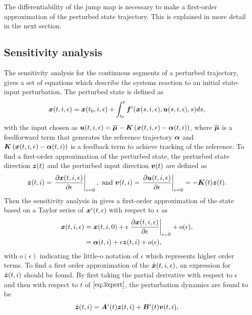 \documentclass[../DC2017114Bouma.tex]{subfiles}
\begin{document}
The differentiability of the jump map is necessary to make a first-order approximation of the perturbed state trajectory. This is explained in more detail in the next section.

\subsection{Sensitivity analysis}
The sensitivity analysis for the continuous segments of a perturbed trajectory, gives a set of equations which describe the systems reaction to an initial state-input perturbation. The perturbed state is defined as
\begin{align}
{\boldsymbol{x}}(t,i,\epsilon) = {\boldsymbol{x}}(t_0,i,\epsilon) + \int_{t_0}^{t}{\boldsymbol{f}}^i({\boldsymbol{x}}(s,i,\epsilon),{\boldsymbol{u}}(s,i,\epsilon),s)ds,\label{eq:3xpert}
\end{align}
with the input chosen as ${\boldsymbol{u}}(t,i,\epsilon) = \overline{\boldsymbol{\mu}} - {\boldsymbol{K}}\left({\boldsymbol{x}}(t,i,\epsilon)-\boldsymbol{\alpha}(t,i)\right)$, where $\overline{\boldsymbol{\mu}}$ is a feedforward term that generates the reference trajectory $\boldsymbol{\alpha}$ and ${\boldsymbol{K}}\left({\boldsymbol{x}}(t,i,\epsilon)-\boldsymbol{\alpha}(t,i)\right)$ is a feedback term to achieve tracking of the reference. To find a first-order approximation of the perturbed state, the perturbed state direction ${\boldsymbol{z}}(t)$ and the perturbed input direction ${\boldsymbol{v}}(t)$ are defined as
\begin{align}
{\boldsymbol{z}}(t,i) = \left.\frac{\partial{\boldsymbol{x}}(t,i,\epsilon)}{\partial\epsilon}\right|_{\epsilon=0},\text{ and } {\boldsymbol{v}}(t,i) = \left.\frac{\partial{\boldsymbol{u}}(t,i,\epsilon)}{\partial\epsilon}\right|_{\epsilon=0}=-{\boldsymbol{K}}(t){\boldsymbol{z}}(t).
\end{align}
Then the sensitivity analysis in \cite{Khalil1996} gives a first-order approximation of the state based on a Taylor series of ${\boldsymbol{x}}^i(t,\epsilon)$ with respect to $\epsilon$ as
\begin{align}
{\boldsymbol{x}}(t,i,\epsilon) &= {\boldsymbol{x}}(t,i,0) + \epsilon\left.\frac{\partial{\boldsymbol{x}}(t,i,\epsilon)}{\partial\epsilon}\right|_{\epsilon=0} + o(\epsilon),\label{eq:3taylor}\\
&= \boldsymbol{\alpha}(t,i) + \epsilon{\boldsymbol{z}}(t,i) + o(\epsilon),
\end{align}
with $o(\epsilon)$ indicating the little-o notation of $\epsilon$ which represents higher order terms. To find a first order approximation of the $\dot{{\boldsymbol{x}}}(t,i,\epsilon)$, an expression for $\dot{{\boldsymbol{z}}}(t,i)$ should be found. By first taking the partial derivative with respect to $\epsilon$ and then with respect to $t$ of $\eqref{eq:3xpert}$, the perturbation dynamics are found to be
\begin{align}
\dot{{\boldsymbol{z}}}(t,i) = {\boldsymbol{A}}^i(t){\boldsymbol{z}}(t,i) +{\boldsymbol{B}}^i(t){\boldsymbol{v}}(t,i),
\end{align}
\end{document}
